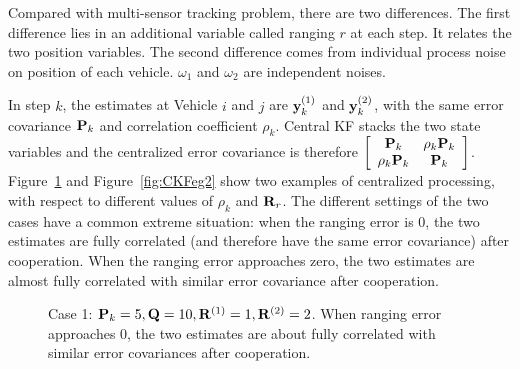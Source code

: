 Compared with multi-sensor tracking problem, there are two differences. The first difference lies in an additional variable called ranging $r$ at each step. It relates the two position variables. The second difference comes from individual process noise on position of each vehicle. $\omega_1$ and $\omega_2$ are independent noises.%

In step $k$, the estimates at Vehicle $i$ and $j$ are ${\bf y}_k^{(1)}$ and ${\bf y}_k^{(2)}$, with the same error covariance ${\bf P}_k$ and correlation coefficient $\rho_k$. Central KF stacks the two state variables and the centralized error covariance is therefore 
$\left[
          \begin{array}{cc}
            {\bf P}_k & \rho_k{\bf P}_k \\
            \rho_k{\bf P}_k & {\bf P}_k\\
          \end{array}
        \right]$. Figure~\ref{fig:CKFeg1} and Figure~\ref{fig:CKFeg2} show two examples of centralized processing, with respect to different values of $\rho_k$ and ${\bf R}_r$. The different settings of the two cases have a common extreme situation: when the ranging error is 0, the two estimates are fully correlated (and therefore have the same error covariance) after cooperation. When the ranging error approaches zero, the two estimates are almost fully correlated with similar error covariance after cooperation.
        
         \begin{figure}[htbp]
\begin{center}
\caption{Case 1: ${\bf P}_k=5,{\bf Q}=10,{\bf R}^{(1)}=1,{\bf R}^{(2)}=2$. When ranging error approaches 0, the two estimates are about fully correlated with similar error covariances after cooperation.}
\label{fig:CKFeg1}
\end{center}
\end{figure}

